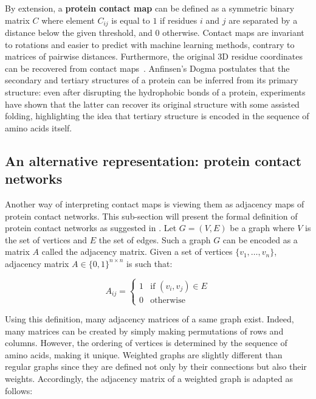         By extension, a \textbf{protein contact map} can be defined as a symmetric binary matrix $C$ where element $C_{ij}$ 
        is equal to $1$ if residues $i$ and $j$
        are separated by a distance below the given threshold, and $0$ otherwise. Contact maps are invariant to rotations and easier to predict
        with machine learning methods, contrary to matrices of pairwise distances. Furthermore, the original 3D residue coordinates can be recovered from
        contact maps~\cite{10.1007/978-3-540-72031-7_53}. Anfinsen's Dogma postulates that the secondary and tertiary structures
        of a protein can be inferred from its primary structure: even after disrupting the hydrophobic bonds of a protein, experiments have shown
        that the latter can recover its original structure with some assisted folding,
        highlighting the idea that tertiary structure is encoded in the sequence of amino acids itself.


    \subsection{An alternative representation: protein contact networks} \label{pcn}

        Another way of interpreting contact maps is viewing them as adjacency maps of protein contact networks.
        This sub-section will present the formal definition of protein contact networks as suggested in \cite{doi:10.1021/cr3002356}.
        Let $G = (V, E)$ be a graph where $V$ is the set of vertices and $E$ the set of edges. Such a graph $G$ can be encoded as a matrix $A$ called
        the adjacency matrix. Given a set of vertices $\{ v_1, \ldots, v_n \}$, adjacency matrix $A \in \{ 0, 1 \}^{n \times n}$ is such that:

        \begin{equation}
            A_{ij} =
                \begin{cases}
                    1 & \text{if } (v_i, v_j) \in E \\
                    0 & \text{otherwise}
                \end{cases}
        \end{equation}

        Using this definition, many adjacency matrices of a same graph exist. Indeed, many matrices can be created by simply
        making permutations of rows and columns. However, the ordering of vertices is determined by the sequence
        of amino acids, making it unique.
        Weighted graphs are slightly different than regular graphs since they are defined not only by their connections but also their weights.
        Accordingly, the adjacency matrix of a weighted graph is adapted as follows:

